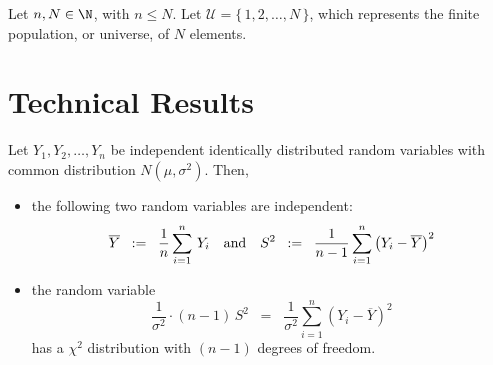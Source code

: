 \documentclass{article}
\begin{document}
Let $n, N \in \N$, with $n \leq N$.  Let $\mathcal{U} = \{\,1,2,\ldots,N\,\}$, which represents the finite population, or universe, of $N$ elements.  


\appendix


\section{Technical Results}
\setcounter{theorem}{0}

\begin{theorem}
\mbox{}\vskip 0.15cm\noindent
Let $Y_{1}, Y_{2}, \ldots, Y_{n}$ be independent identically distributed random variables with common distribution $N(\mu,\sigma^{2})$.  Then,
\begin{itemize}
\item  the following two random variables are independent:
          \begin{equation*}
          \overline{Y} \;\; := \;\; \frac{1}{n}\sum^{n}_{i=1}\,Y_{i}
          \quad\textnormal{and}\quad
          S^{2} \;\; := \;\; \frac{1}{n-1}\sum^{n}_{i=1}\left(Y_{i}-\overline{Y}\right)^{2}
          \end{equation*}
\item  the random variable
          \begin{equation*}
          \dfrac{1}{\sigma^{2}}\cdot(n-1)\,S^{2} \;\; = \;\; \dfrac{1}{\sigma^{2}}\sum^{n}_{i=1}(Y_{i}-\overline{Y})^{2}
          \end{equation*}
          has a $\chi^{2}$ distribution with $(n-1)$ degrees of freedom.
\end{itemize}
\end{theorem}




%
%
%
%
%

\end{document}
